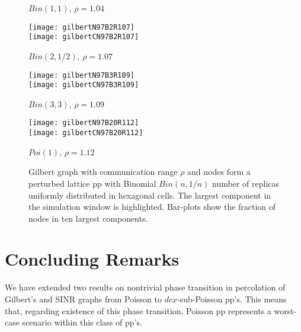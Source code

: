 \documentclass[conference]{IEEEtran}
\begin{document}
\begin{figure*}[!t]
\begin{center}
{\begin{minipage}[b]{0.22\linewidth}
\centerline{$Bin(1,1)$, $\rho=1.04$}
\end{minipage}
\hspace{0.02\linewidth}
\begin{minipage}[b]{0.22\linewidth}
\texttt{[image: gilbertN97B2R107]}\\[-0.6\linewidth]
\hbox{}\hspace{-0.16\linewidth}
\texttt{[image: gilbertCN97B2R107]}\\
\centerline{$Bin(2,1/2)$, $\rho=1.07$}
\end{minipage}
\hspace{0.02\linewidth}
\begin{minipage}[b]{0.22\linewidth}
\texttt{[image: gilbertN97B3R109]}\\[-0.6\linewidth]
\hbox{}\hspace{-0.16\linewidth}
\texttt{[image: gilbertCN97B3R109]}\\
\centerline{$Bin(3,3)$, $\rho=1.09$}
\end{minipage}
\hspace{0.02\linewidth}
\begin{minipage}[b]{0.22\linewidth}
\texttt{[image: gilbertN97B20R112]}\\[-0.6\linewidth]
\hbox{}\hspace{-0.16\linewidth}
\texttt{[image: gilbertCN97B20R112]}\\
\centerline{$Poi(1)$, $\rho=1.12$}
\end{minipage}}
\end{center}
\vspace{-5ex}
\caption{\label{f.Gilbert1}
Gilbert graph with communication range $\rho$
and nodes form a perturbed lattice pp with Binomial $Bin(n,1/n)$
number of replicas uniformly distributed in hexagonal cells. The
largest component in the simulation window is highlighted. Bar-plots
show the fraction of nodes in ten largest components.}
\vspace{-3ex}
\end{figure*}

\section{Concluding Remarks}
\label{s.Conclusions}
We have extended two results on nontrivial phase transition 
in  percolation of Gilbert's and SINR
graphs from Poisson to  $dcx$-sub-Poisson pp's.
This means that, regarding existence of this phase transition,
Poisson pp represents a worst-case scenario
within this class of pp's.
\end{document}
